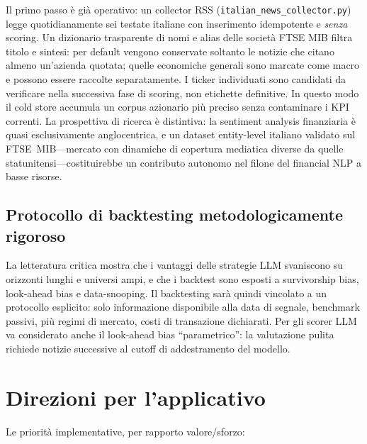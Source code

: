 Il primo passo è già operativo: un collector RSS (\texttt{italian\_news\_collector.py}) legge quotidianamente sei testate italiane con inserimento idempotente e \emph{senza} scoring. Un dizionario trasparente di nomi e alias delle società FTSE MIB filtra titolo e sintesi: per default vengono conservate soltanto le notizie che citano almeno un'azienda quotata; quelle economiche generali sono marcate come macro e possono essere raccolte separatamente. I ticker individuati sono candidati da verificare nella successiva fase di scoring, non etichette definitive. In questo modo il cold store accumula un corpus azionario più preciso senza contaminare i KPI correnti.
La prospettiva di ricerca è distintiva: la sentiment analysis finanziaria è quasi esclusivamente anglocentrica, e un dataset entity-level italiano validato sul FTSE~MIB---mercato con dinamiche di copertura mediatica diverse da quelle statunitensi---costituirebbe un contributo autonomo nel filone del financial NLP a basse risorse.

\subsection{Protocollo di backtesting metodologicamente rigoroso}

La letteratura critica \parencite{li2025finsaber} mostra che i vantaggi delle strategie LLM svaniscono su orizzonti lunghi e universi ampi, e che i backtest sono esposti a survivorship bias, look-ahead bias e data-snooping.
Il backtesting sarà quindi vincolato a un protocollo esplicito: solo informazione disponibile alla data di segnale, benchmark passivi, più regimi di mercato, costi di transazione dichiarati.
Per gli scorer LLM va considerato anche il look-ahead bias ``parametrico'': la valutazione pulita richiede notizie successive al cutoff di addestramento del modello.

\section{Direzioni per l'applicativo}

Le priorità implementative, per rapporto valore/sforzo:

